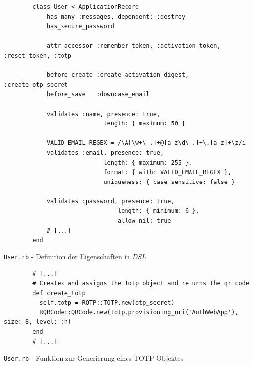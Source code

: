 \documentclass[11pt,a4paper,ngerman]{scrreprt}
\begin{document}
\begin{listing}[htpb]
    \begin{verbatim}
        class User < ApplicationRecord
            has_many :messages, dependent: :destroy
            has_secure_password
        
            attr_accessor :remember_token, :activation_token, :reset_token, :totp
        
            before_create :create_activation_digest, :create_otp_secret
            before_save   :downcase_email
        
            validates :name, presence: true,
                            length: { maximum: 50 }
        
            VALID_EMAIL_REGEX = /\A[\w+\-.]+@[a-z\d\-.]+\.[a-z]+\z/i
            validates :email, presence: true,
                            length: { maximum: 255 },
                            format: { with: VALID_EMAIL_REGEX },
                            uniqueness: { case_sensitive: false }
        
            validates :password, presence: true,
                                length: { minimum: 6 },
                                allow_nil: true
            # [...]
        end
    \end{verbatim}
    \caption{\texttt{User.rb} - Definition der Eigenschaften in \textit{DSL}}
    \label{lst:User.rb-dsl}
\end{listing}

\begin{listing}[htpb]
    \begin{verbatim}
        # [...]
        # Creates and assigns the totp object and returns the qr code
        def create_totp
          self.totp = ROTP::TOTP.new(otp_secret)
          RQRCode::QRCode.new(totp.provisioning_uri('AuthWebApp'), size: 8, level: :h)
        end
        # [...]
    \end{verbatim}
    \caption{\texttt{User.rb} - Funktion zur Generierung eines TOTP-Objektes}
    \label{lst:User.rb-createTOTP}
\end{listing}
\clearpage
\end{document}
